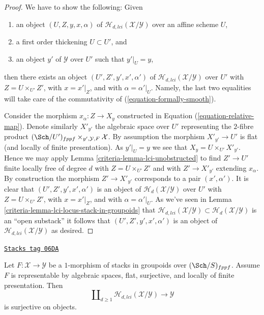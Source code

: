 \begin{proof}

We have to show the following: Given
\begin{enumerate}
\item an object $(U, Z, y, x, \alpha)$ of
$\mathcal{H}_{d, lci}(\mathcal{X}/\mathcal{Y})$ over an affine scheme $U$,
\item a first order thickening $U \subset U'$, and
\item an object $y'$ of $\mathcal{Y}$ over $U'$ such that $y'|_U = y$,
\end{enumerate}
then there exists an object $(U', Z', y', x', \alpha')$ of
$\mathcal{H}_{d, lci}(\mathcal{X}/\mathcal{Y})$ over $U'$ with
$Z = U \times_{U'} Z'$, with $x = x'|_Z$, and with
$\alpha = \alpha'|_U$. Namely, the last two equalities will take care
of the commutativity of (\ref{equation-formally-smooth}).

\medskip\noindent
Consider the morphism $x_\alpha : Z \to X_y$ constructed in
Equation (\ref{equation-relative-map}). Denote similarly $X'_{y'}$
the algebraic space over $U'$ representing the $2$-fibre product
$(\Sch/U')_{fppf} \times_{y', \mathcal{Y}, F} \mathcal{X}$.
By assumption the morphism $X'_{y'} \to U'$ is flat (and locally of finite
presentation). As $y'|_U = y$ we see that $X_y = U \times_{U'} X'_{y'}$.
Hence we may apply
Lemma \ref{criteria-lemma-lci-unobstructed}
to find $Z' \to U'$ finite locally free of degree $d$ with
$Z = U \times_{U'} Z'$ and with $Z' \to X'_{y'}$ extending $x_\alpha$.
By construction the morphism $Z' \to X'_{y'}$ corresponds to a pair
$(x', \alpha')$. It is clear that $(U', Z', y', x', \alpha')$
is an object of $\mathcal{H}_d(\mathcal{X}/\mathcal{Y})$ over $U'$
with $Z = U \times_{U'} Z'$, with $x = x'|_Z$, and with
$\alpha = \alpha'|_U$. As we've seen in
Lemma \ref{criteria-lemma-lci-locus-stack-in-groupoids}
that $\mathcal{H}_{d, lci}(\mathcal{X}/\mathcal{Y}) \subset
\mathcal{H}_d(\mathcal{X}/\mathcal{Y})$ is an ``open substack''
it follows that $(U', Z', y', x', \alpha')$ is an object of
$\mathcal{H}_{d, lci}(\mathcal{X}/\mathcal{Y})$ as desired.
\end{proof}

\begin{lemma}
\label{criteria-lemma-lci-surjective}
\href{https://stacks.math.columbia.edu/tag/06DA}{\texttt{Stacks tag 06DA}}

Let $F : \mathcal{X} \to \mathcal{Y}$ be a $1$-morphism of stacks in groupoids
over $(\Sch/S)_{fppf}$. Assume $F$ is representable by algebraic
spaces, flat, surjective, and locally of finite presentation. Then
$$
\coprod\nolimits_{d \geq 1} \mathcal{H}_{d, lci}(\mathcal{X}/\mathcal{Y})
\longrightarrow
\mathcal{Y}
$$
is surjective on objects.
\end{lemma}

